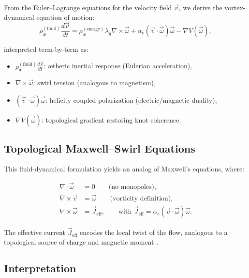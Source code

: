 From the Euler--Lagrange equations for the velocity field \( \vec{v} \), we derive the vortex-dynamical equation of motion:
\begin{equation}
\label{eq:VAM_dynamics}
\rho_\text{\ae}^{(\text{fluid})} \frac{d \vec{v}}{dt} =
\rho_\text{\ae}^{(\text{energy})} \lambda_g \nabla \times \vec{\omega}
+ \alpha_e (\vec{v} \cdot \vec{\omega}) \vec{\omega}
- \nabla V(\vec{\omega}),
\end{equation}

interpreted term-by-term as:
\begin{itemize}
    \item \( \rho_\text{\ae}^{(\text{fluid})} \frac{d \vec{v}}{dt} \): ætheric inertial response (Eulerian acceleration),
    \item \( \nabla \times \vec{\omega} \): swirl tension (analogous to magnetism),
    \item \( (\vec{v} \cdot \vec{\omega}) \vec{\omega} \): helicity-coupled polarization (electric/magnetic duality),
    \item \( \nabla V(\vec{\omega}) \): topological gradient restoring knot coherence.
\end{itemize}

\subsection*{Topological Maxwell–Swirl Equations}

This fluid-dynamical formulation yields an analog of Maxwell’s equations, where:

\begin{align}
\nabla \cdot \vec{\omega} &= 0 \qquad \text{(no monopoles)}, \label{eq:divB} \\
\nabla \times \vec{v} &= \vec{\omega} \qquad \text{(vorticity definition)}, \label{eq:curlE} \\
\nabla \times \vec{\omega} &= \vec{J}_\text{eff}, \qquad \text{with } \vec{J}_\text{eff} = \alpha_e (\vec{v} \cdot \vec{\omega}) \vec{\omega}. \label{eq:ampere}
\end{align}

The effective current \( \vec{J}_\text{eff} \) encodes the local twist of the flow, analogous to a topological source of charge and magnetic moment \cite{yakovenko2021fluid,finn2020helicity}.

\subsection*{Interpretation}

